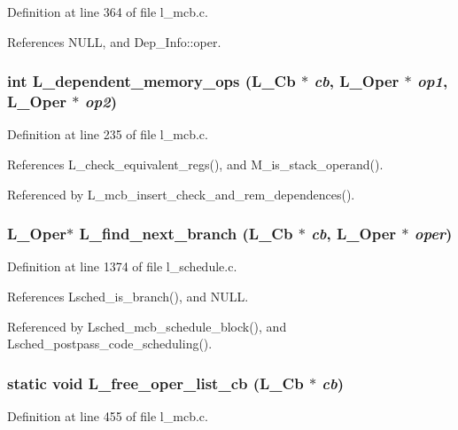 Definition at line 364 of file l\_\-mcb.c.

References NULL, and Dep\_\-Info::oper.
\subsubsection{\setlength{\rightskip}{0pt plus 5cm}int L\_\-dependent\_\-memory\_\-ops (L\_\-Cb $\ast$ {\em cb}, L\_\-Oper $\ast$ {\em op1}, L\_\-Oper $\ast$ {\em op2})}\label{l__mcb_8c_87c9795d2b98de45ce888950080a3f9f}




Definition at line 235 of file l\_\-mcb.c.

References L\_\-check\_\-equivalent\_\-regs(), and M\_\-is\_\-stack\_\-operand().

Referenced by L\_\-mcb\_\-insert\_\-check\_\-and\_\-rem\_\-dependences().
\subsubsection{\setlength{\rightskip}{0pt plus 5cm}L\_\-Oper$\ast$ L\_\-find\_\-next\_\-branch (L\_\-Cb $\ast$ {\em cb}, L\_\-Oper $\ast$ {\em oper})}\label{l__mcb_8c_6d691d5261d79228e4e680680a58f405}




Definition at line 1374 of file l\_\-schedule.c.

References Lsched\_\-is\_\-branch(), and NULL.

Referenced by Lsched\_\-mcb\_\-schedule\_\-block(), and Lsched\_\-postpass\_\-code\_\-scheduling().
\subsubsection{\setlength{\rightskip}{0pt plus 5cm}static void L\_\-free\_\-oper\_\-list\_\-cb (L\_\-Cb $\ast$ {\em cb})\hspace{0.3cm}{\tt  [static]}}\label{l__mcb_8c_0e603faf6b2763b633839759cf999737}




Definition at line 455 of file l\_\-mcb.c.

